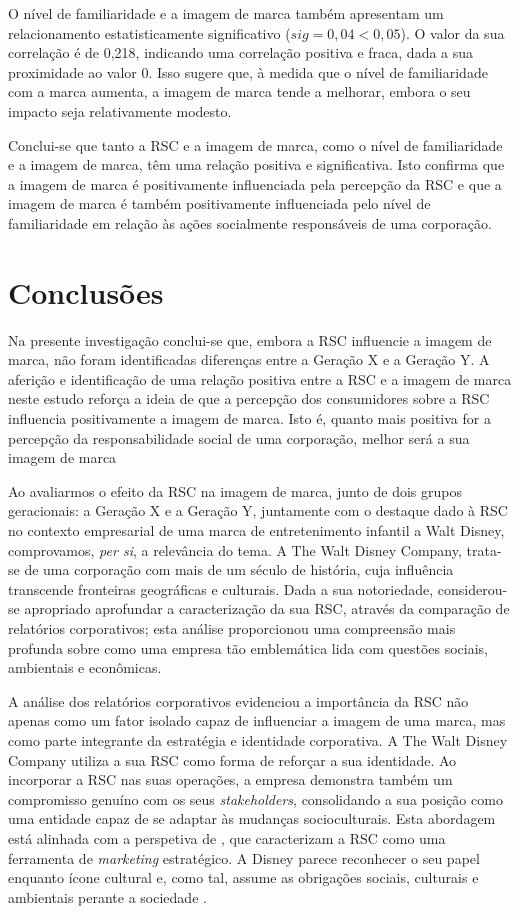 \documentclass[portuguese]{textolivre}
\begin{document}
O nível de familiaridade e a imagem de marca também apresentam um relacionamento estatisticamente significativo ($sig=0,04<0,05$). O valor da sua correlação é de 0,218, indicando uma correlação positiva e fraca, dada a sua proximidade ao valor 0. Isso sugere que, à medida que o nível de familiaridade com a marca aumenta, a imagem de marca tende a melhorar, embora o seu impacto seja relativamente modesto. 

Conclui-se que tanto a RSC e a imagem de marca, como o nível de familiaridade e a imagem de marca, têm uma relação positiva e significativa. Isto confirma que a imagem de marca é positivamente influenciada pela percepção da RSC e que a imagem de marca é também positivamente influenciada pelo nível de familiaridade em relação às ações socialmente responsáveis de uma corporação.

\section{Conclusões}
Na presente investigação conclui-se que, embora a RSC influencie a imagem de marca, não foram identificadas diferenças entre a Geração X e a Geração Y. A aferição e identificação de uma relação positiva entre a RSC e a imagem de marca neste estudo reforça a ideia de que a percepção dos consumidores sobre a RSC influencia positivamente a imagem de marca. Isto é, quanto mais positiva for a percepção da responsabilidade social de uma corporação, melhor será a sua imagem de marca

Ao avaliarmos o efeito da RSC na imagem de marca, junto de dois grupos geracionais: a Geração X e a Geração Y, juntamente com o destaque dado à RSC no contexto empresarial de uma marca de entretenimento infantil a Walt Disney, comprovamos, \textit{per si}, a relevância do tema. A The Walt Disney Company, trata-se de uma corporação com mais de um século de história, cuja influência transcende fronteiras geográficas e culturais. Dada a sua notoriedade, considerou-se apropriado aprofundar a caracterização da sua RSC, através da comparação de relatórios corporativos; esta análise proporcionou uma compreensão mais profunda sobre como uma empresa tão emblemática lida com questões sociais, ambientais e econômicas.

A análise dos relatórios corporativos evidenciou a importância da RSC não apenas como um fator isolado capaz de influenciar a imagem de uma marca, mas como parte integrante da estratégia e identidade corporativa. A The Walt Disney Company utiliza a sua RSC como forma de reforçar a sua identidade.  Ao incorporar a RSC nas suas operações, a empresa demonstra também um compromisso genuíno com os seus \textit{stakeholders}, consolidando a sua posição como uma entidade capaz de se adaptar às mudanças socioculturais. Esta abordagem está alinhada com a perspetiva de \textcite{he_effect_2014}, que caracterizam a RSC como uma ferramenta de \textit{marketing} estratégico. A Disney parece reconhecer o seu papel enquanto ícone cultural e, como tal, assume as obrigações sociais, culturais e ambientais perante a sociedade \cite{heding_brand_2020}.
\end{document}

